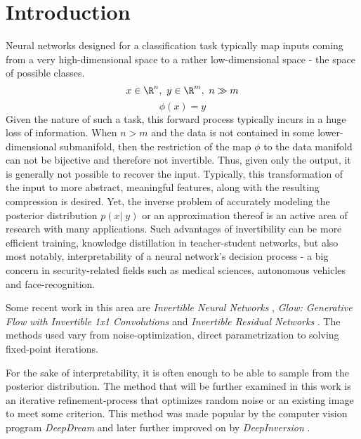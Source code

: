 \chapter{Introduction}

\label{Introduction}

Neural networks designed for a classification task typically map inputs coming from a very high-dimensional space to a rather low-dimensional space - the space of possible classes.
$$
x \in \R^n,\ y \in \R^m ,\ n \gg m
$$
$$\phi (x) = y
$$
Given the nature of such a task, this forward process typically incurs in a huge loss of information. When $n > m$ and the data is not contained in some lower-dimensional submanifold, then the restriction of the map $\phi$ to the data manifold can not be bijective and therefore not invertible. 
Thus, given only the output, it is generally not possible to recover the input.
Typically, this transformation of the input to more abstract, meaningful features, along with the resulting compression is desired. Yet, the inverse problem of accurately modeling the posterior distribution $p(x|\;y)$ or an approximation thereof is an active area of research with many applications.
Such advantages of invertibility can be more efficient training, knowledge distillation in teacher-student networks, but also most notably, interpretability of a neural network's decision process - a big concern in security-related fields such as medical sciences, autonomous vehicles and face-recognition. 

Some recent work in this area are \textit{Invertible Neural Networks} \citep{ardizzone2018analyzing} , \textit{Glow: Generative Flow with Invertible 1x1 Convolutions} \citep{kingma2018glow} and \textit{Invertible Residual Networks} \citep{behrmann2018invertible}. The methods used vary from noise-optimization, direct parametrization to solving fixed-point iterations.

For the sake of interpretability, it is often enough to be able to sample from the posterior distribution.
The method that will be further examined in this work is an iterative refinement-process that optimizes random noise or an existing image to meet some criterion. This method was made popular by the computer vision program \textit{DeepDream} \citep{DeepDream} and later further improved on by \textit{DeepInversion} \citep{DeepInversion}.
